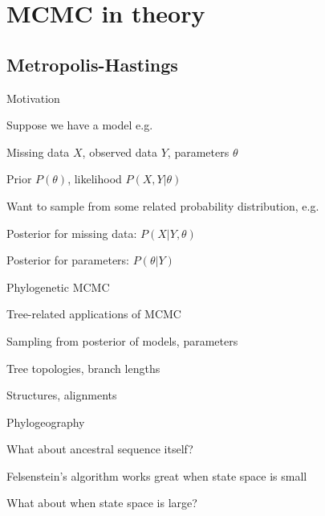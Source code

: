 \documentclass{beamer}
\begin{document}
\section{MCMC in theory}

\subsection{Metropolis-Hastings}


\begin{frame}{Motivation}

\itemb
\item Suppose we have a model e.g.
\itemb
\item Missing data $X$, observed data $Y$, parameters $\theta$
\item Prior $P(\theta)$, likelihood $P(X,Y|\theta)$
\iteme
\item Want to sample from some related probability distribution, e.g.
\itemb
\item Posterior for missing data: $P(X|Y,\theta)$
\item Posterior for parameters: $P(\theta|Y)$
\iteme
\iteme

\end{frame}

\begin{frame}{Phylogenetic MCMC}

Tree-related applications of MCMC
\itemb
\item Sampling from posterior of models, parameters
 \itemb
 \item Tree topologies, branch lengths
 \item Structures, alignments
 \item Phylogeography
 \iteme
\item What about ancestral sequence itself?
 \itemb
 \item Felsenstein's algorithm works great when state space is small
 \item What about when state space is large?
 \iteme
\iteme

\end{frame}
\end{document}
